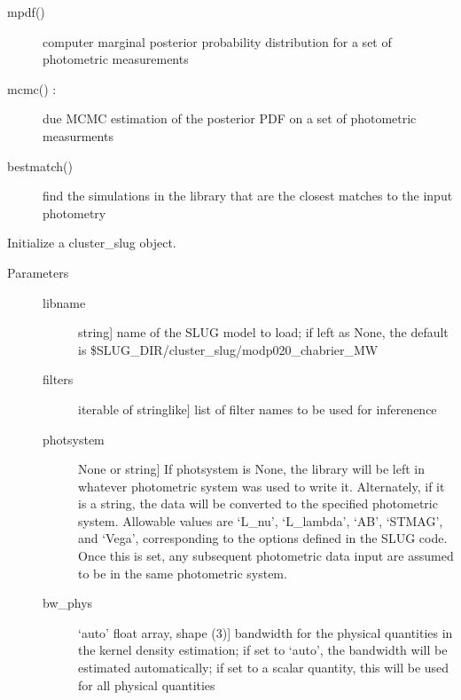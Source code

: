\documentclass[letterpaper,10pt,english]{sphinxmanual}
\begin{document}
\begin{fulllineitems}
\begin{description}
\begin{description}
\item[{mpdf()}] \leavevmode{[}{]}
computer marginal posterior probability distribution for a
set of photometric measurements

\item[{mcmc() :}] \leavevmode
due MCMC estimation of the posterior PDF on a set of
photometric measurments

\item[{bestmatch()}] \leavevmode{[}{]}
find the simulations in the library that are the closest
matches to the input photometry

\end{description}

\end{description}

\begin{fulllineitems}
\label{cluster_slug:slugpy.cluster_slug.cluster_slug.__init__}
Initialize a cluster\_slug object.
\begin{description}
\item[{Parameters}] \leavevmode\begin{description}
\item[{libname}] \leavevmode{[}string{]}
name of the SLUG model to load; if left as None, the default
is \$SLUG\_DIR/cluster\_slug/modp020\_chabrier\_MW

\item[{filters}] \leavevmode{[}iterable of stringlike{]}
list of filter names to be used for inferenence

\item[{photsystem}] \leavevmode{[}None or string{]}
If photsystem is None, the library will be left in
whatever photometric system was used to write
it. Alternately, if it is a string, the data will be
converted to the specified photometric system. Allowable
values are `L\_nu', `L\_lambda', `AB', `STMAG', and
`Vega', corresponding to the options defined in the SLUG
code. Once this is set, any subsequent photometric data
input are assumed to be in the same photometric system.

\item[{bw\_phys}] \leavevmode{[}`auto' \textbar{} float \textbar{} array, shape (3){]}
bandwidth for the physical quantities in the kernel
density estimation; if set to `auto', the bandwidth will
be estimated automatically; if set to a scalar quantity,
this will be used for all physical quantities


\end{description}
\end{description}
\end{fulllineitems}
\end{fulllineitems}
\end{document}
